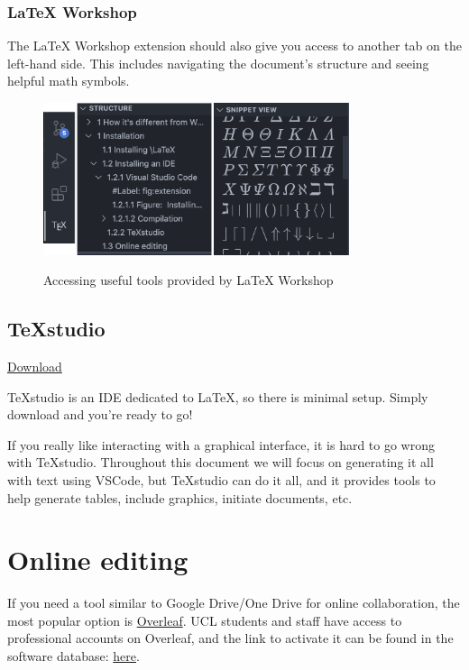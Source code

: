 \subsubsection{LaTeX Workshop}
The LaTeX Workshop extension should also give you access to another tab on the left-hand side.
This includes navigating the document's structure and seeing helpful math symbols.
\begin{figure}[h]
\centering
    \includegraphics[width=0.8\textwidth]{figures/symbols.png}
\label{fig:symbols}
\caption{Accessing useful tools provided by LaTeX Workshop}
\end{figure}

\subsection{TeXstudio}
\href{https://www.texstudio.org/}{Download}

TeXstudio is an IDE dedicated to \LaTeX{}, so there is minimal setup. Simply download and you're ready to go!

If you really like interacting with a graphical interface, it is hard to go wrong with TeXstudio.
Throughout this document we will focus on generating it all with text using VSCode, but TeXstudio can do it all, and it provides tools to help generate tables, include graphics, initiate documents, etc.

\section{Online editing}
If you need a tool similar to Google Drive/One Drive for online collaboration, the most popular option is \href{https://www.overleaf.com/}{Overleaf}.
UCL students and staff have access to professional accounts on Overleaf, and the link to activate it can be found in the software database: \href{https://swdb.ucl.ac.uk/package/view/id/1235}{here}.